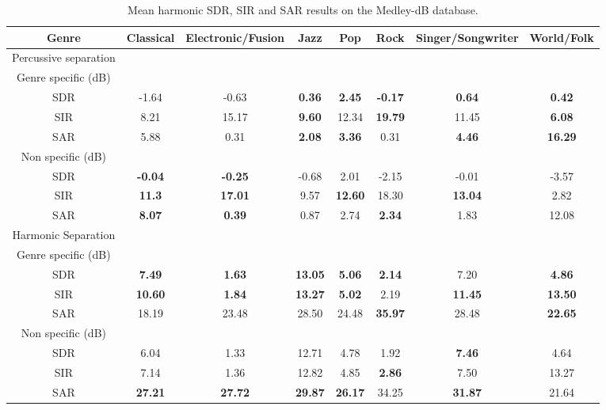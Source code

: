 \documentclass{article}
\begin{document}
\begin{table}
   
   \begin{tabular}{|c|c|c|c|c|c|c|c|}
\hline   
Genre & Classical & Electronic/Fusion & Jazz & Pop & Rock & Singer/Songwriter & World/Folk \\
\hline
Percussive separation & & & & & & & \\
\hline
Genre specific (dB)  & & & & & & & \\
SDR & -1.64     & -0.63     &\bf{0.36} & \bf{2.45}&\bf{-0.17}& \bf{0.64} & \bf{0.42} \\
SIR & 8.21      & 15.17     &\bf{9.60} & 12.34    &\bf{19.79}& 11.45     & \bf{6.08} \\
SAR & 5.88      & 0.31      &\bf{2.08} & \bf{3.36}& 0.31     & \bf{4.46} & \bf{16.29} \\
\hline
Non specific (dB) & & & & & & &\\
SDR & \bf{-0.04}& \bf{-0.25}& -0.68    & 2.01     & -2.15    & -0.01     & -3.57 \\
SIR & \bf{11.3} & \bf{17.01}& 9.57     &\bf{12.60}& 18.30    & \bf{13.04}& 2.82 \\
SAR & \bf{8.07} & \bf{0.39} & 0.87     & 2.74     &\bf{2.34} & 1.83      & 12.08 \\
\hline   
Harmonic Separation &  & & & & & & \\  
\hline
Genre specific (dB)  & & & & & & & \\
SDR & \bf{7.49}    & \bf{1.63}    & \bf{13.05} & \bf{5.06}  & \bf{2.14}& 7.20      &\bf{4.86} \\
SIR & \bf{10.60}   & \bf{1.84}    & \bf{13.27} & \bf{5.02 } & 2.19     & \bf{11.45}& \bf{13.50} \\
SAR & 18.19       & 23.48       & 28.50      & 24.48      &\bf{35.97}& 28.48     & \bf{22.65} \\
\hline
Non specific (dB) & & & & & & &\\
SDR & 6.04        & 1.33        & 12.71     & 4.78      & 1.92      & \bf{7.46}      & 4.64\\
SIR & 7.14        & 1.36        & 12.82     & 4.85      & \bf{2.86} & 7.50      & 13.27 \\
SAR & \bf{27.21}& \bf{27.72}   & \bf{29.87} & \bf{26.17}& 34.25     &\bf{31.87} & 21.64\\
\hline
  \end{tabular} 
\caption{\label{specresults} Mean harmonic SDR, SIR and SAR results on the Medley-dB database.}
\end{table}
\end{document}

